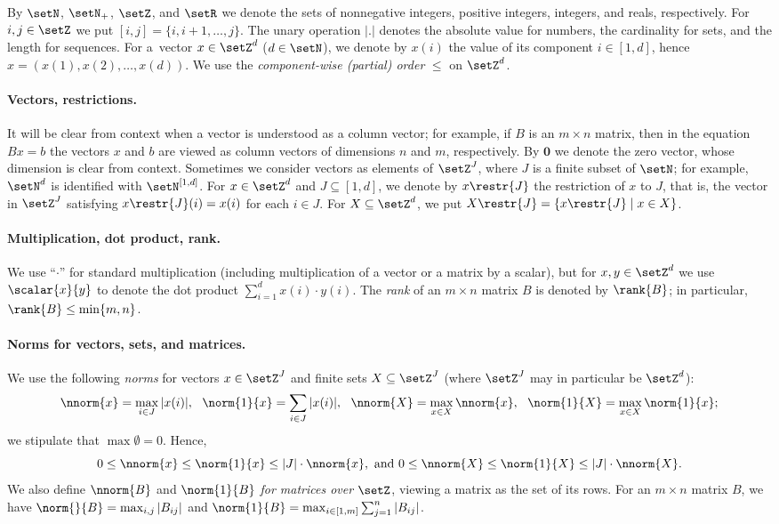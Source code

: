By $\setN$, $\setN_+$, $\setZ$, and $\setR$ we denote the sets of nonnegative
integers, positive integers, integers, and reals, respectively.
For $i,j\in\setZ$ we put $[i,j]=\{i,i{+}1,\dots,j\}$.
The unary operation $|.|$ denotes the absolute value for numbers, the
cardinality for sets, and the length for sequences.
For a~vector $x\in\setZ^d$ ($d\in\setN$), we denote by $x(i)$ the value of its
component $i\in[1,d]$, 
hence $x=(x(1),x(2),\ldots,x(d))$. 
We use the \emph{component-wise (partial) order} $\leq$ on $\setZ^d$.


\paragraph{Vectors, restrictions.}
It will be clear from context when a vector is understood as a column vector; for example, if $B$ is an $m\times n$ matrix, then in the equation $Bx=b$ the vectors $x$ and $b$ are viewed as column vectors of dimensions $n$ and $m$, respectively. By $\mathbf{0}$ we denote the zero vector, whose dimension is clear from context.
Sometimes we consider vectors as elements of $\setZ^J$, where $J$ is a finite subset of $\setN$; for example, $\setN^d$ is identified with $\setN^{[1,d]}$.
For $x\in \setZ^d$ and $J\subseteq[1,d]$, we denote by $x\restr{J}$
the restriction of $x$ to $J$, that is, the vector in $\setZ^J$
satisfying $x\restr{J}(i)=x(i)$ for each $i\in J$. For
$X\subseteq\setZ^d$, we put $X\restr{J}=\{x\restr{J}\mid x\in X\}$.

\paragraph{Multiplication, dot product, rank.}
We use “$\cdot$” for standard multiplication (including multiplication of a vector or a matrix by a scalar), but for $x,y\in\setZ^d$ we use $\scalar{x}{y}$ to denote the dot product $\sum_{i=1}^d x(i)\cdot y(i)$.
The \emph{rank} of an $m\times n$ matrix $B$ is denoted by $\rank{B}$;
in particular, $\rank{B}\leq\min\{m,n\}$.

\paragraph{Norms for vectors, sets, and matrices.}
We use the following \emph{norms} for vectors $x\in\setZ^J$ and finite sets $X\subseteq\setZ^J$ (where $\setZ^J$ may in particular be $\setZ^d$):
\[
	\nnorm{x}=\max_{i\in J}|x(i)|, \ \ 
	\norm{1}{x}=\sum_{i\in J}|x(i)|, \ \ 
\nnorm{X}=\max_{x\in X}\nnorm{x}, \ \ 
	\norm{1}{X}=\max_{x\in X}\norm{1}{x};
\]
we stipulate that $\max\emptyset=0$.
Hence,
	\[0\leq\nnorm{x}\leq\norm{1}{x}\leq |J|\cdot\nnorm{x},
	{\textnormal{ and }}
0\leq\nnorm{X}\leq\norm{1}{X}\leq |J|\cdot\nnorm{X}.
	\]
We also define $\nnorm{B}$ and $\norm{1}{B}$ \emph{for matrices over
$\setZ$}, viewing a matrix as the set of its rows.
For an $m\times n$ matrix $B$, we have  
$\norm{}{B}=\max_{i,j}|B_{ij}|$ and
 $\norm{1}{B}=\max_{i\in[1,m]}\sum_{j=1}^n|B_{ij}|$.

